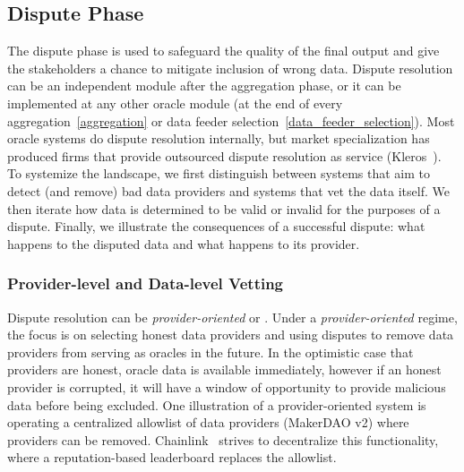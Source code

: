 
% 

\subsection{Dispute Phase}\label{dispute_phase} 



The dispute phase is used to safeguard the quality of the final output and give the stakeholders a chance to mitigate inclusion of wrong data. Dispute resolution can be an independent module after the aggregation phase, or it can be implemented at any other oracle module (\eg at the end of every aggregation~\ref{aggregation} or data feeder selection~\ref{data_feeder_selection}). Most oracle systems do dispute resolution internally, but market specialization has produced firms that provide outsourced dispute resolution as service (\eg Kleros~\cite{kleros}). To systemize the landscape, we first distinguish between systems that aim to detect (and remove) bad data providers and systems that vet the data itself. We then iterate how data is determined to be valid or invalid for the purposes of a dispute. Finally, we illustrate the consequences of a successful dispute: what happens to the disputed data and what happens to its provider. 


\subsubsection{Provider-level and Data-level Vetting}\label{provideranddatavetting}

Dispute resolution can be \textit{provider-oriented} or . Under a \textit{provider-oriented} regime, the focus is on selecting honest data providers and using disputes to remove data providers from serving as oracles in the future. In the optimistic case that providers are honest, oracle data is available immediately, however if an honest provider is corrupted, it will have a window of opportunity to provide malicious data before being excluded. One illustration of a provider-oriented system is operating a centralized allowlist of data providers (\eg MakerDAO v2) where providers can be removed. Chainlink~\cite{ellis2017chainlink}  strives to decentralize this functionality, where a reputation-based leaderboard replaces the allowlist. 

